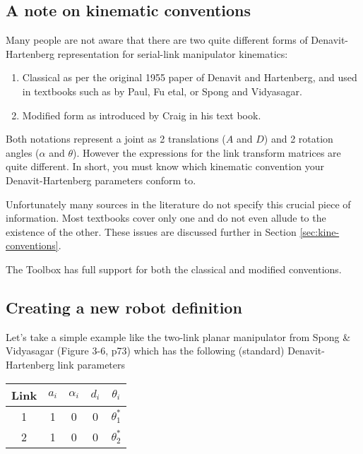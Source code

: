 \documentclass{article}
\begin{document}
\subsection{A note on kinematic conventions}
Many people are not aware that there are two quite different forms of 
Denavit-Hartenberg representation for serial-link manipulator kinematics:
\begin{enumerate}
\item Classical as per the original 1955 paper of Denavit and Hartenberg,
and used in textbooks such as by Paul\cite{Paul81a}, Fu etal\cite{Fu87}, or 
Spong and Vidyasagar\cite{Spong89}.
\item Modified form as introduced by Craig\cite{Craig86} in his text book.
\end{enumerate}
Both notations represent a joint as 2 translations ($A$ and $D$) and 2
rotation angles 
($\alpha$ and $\theta$).  However the expressions for the link transform
matrices are quite different.  In short, you must know which kinematic
convention your Denavit-Hartenberg parameters conform to.

Unfortunately many sources in the literature do not specify this crucial
piece of information.
Most textbooks cover only one and do not even allude to the existence of the
other.
These issues are discussed further in Section \ref{sec:kine-conventions}.

The Toolbox has full support for both the classical and
modified conventions.

\subsection{Creating a new robot definition}
Let's take a simple example like the two-link planar manipulator from
Spong \& Vidyasagar\cite{Spong89} (Figure 3-6, p73) which has the following
(standard) Denavit-Hartenberg link parameters 

\begin{center}
\begin{tabular}{|c|c|c|c|c|} \hline
Link & $a_i$ & $\alpha_i$ & $d_i$ & $\theta_i$ \\ \hline
1 & 1 & 0 & 0 & $\theta_1^*$ \\
2 & 1 & 0 & 0 & $\theta_2^*$ \\ \hline
\end{tabular}
\end{center}
\end{document}

